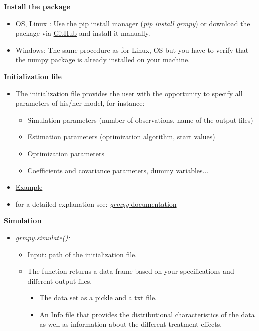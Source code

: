 \begin{frame}
\textbf{Install the package}
\begin{itemize}\setlength\itemsep{1em}
\item OS, Linux : Use the pip install manager (\textit{pip install grmpy}) or download the package via \href{https://github.com/grmToolbox/grmpy}{GitHub} and install it manually.
\item Windows:  The same procedure as for Linux, OS but you have to verify that the numpy package is already installed on your machine.
\end{itemize}
\end{frame}

\begin{frame}
\textbf{Initialization file}
\begin{itemize}\setlength\itemsep{1em}
\item The initialization file provides the user with the opportunity to specify all parameters of his/her model, for instance:\medskip
  \begin{itemize}\setlength\itemsep{1em}
  \item Simulation parameters (number of observations, name of the output files)
  \item Estimation parameters (optimization algorithm, start values)
  \item Optimization parameters
  \item Coefficients and covariance parameters, dummy variables...
  \end{itemize}
\item \href{../shared/04_grmpy_tutorial/application/tutorial.grmpy.ini}{Example}
\item for a detailed explanation see: \href{http://grmpy.readthedocs.io/en/latest/tutorial.html}{\textit{grmpy}-documentation}
\end{itemize}
\end{frame}

\begin{frame}
\textbf{Simulation}
\begin{itemize}\setlength\itemsep{1em}
\item \textit{grmpy.simulate():}\medskip
\begin{itemize}\setlength\itemsep{1em}
\item Input: path of the initialization file.
\item The function returns a data frame based on your specifications and different output files.
\begin{itemize}\setlength\itemsep{1em}
\item The data set as a pickle and a txt file.
\item An \href{../04_grmpy_tutorial_notebook/examples/data.grmpy.info}{Info file} that provides the distributional characteristics of the data as well as information about the different treatment effects.
\end{itemize}

\end{itemize}
\end{itemize}
\end{frame}

